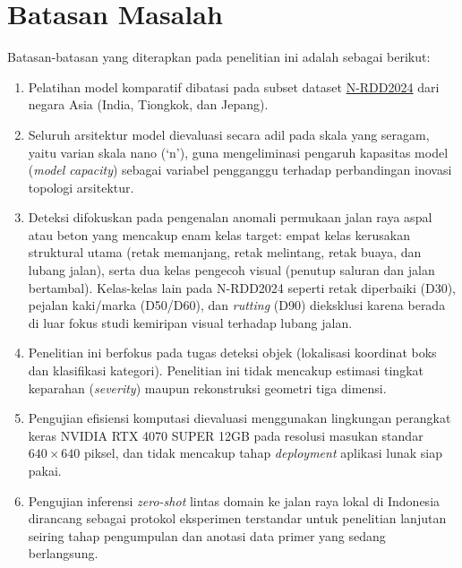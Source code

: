 \section{Batasan Masalah}
Batasan-batasan yang diterapkan pada penelitian ini adalah sebagai berikut:
\begin{enumerate}
  \item Pelatihan model komparatif dibatasi pada subset dataset \textcolor{blue}{\href{https://data.mendeley.com/datasets/27c8pwsd6v/3}{N-RDD2024}} dari negara Asia (India, Tiongkok, dan Jepang).
  \item Seluruh arsitektur model dievaluasi secara adil pada skala yang seragam, yaitu varian skala nano (`n'), guna mengeliminasi pengaruh kapasitas model (\textit{model capacity}) sebagai variabel pengganggu terhadap perbandingan inovasi topologi arsitektur.
  \item Deteksi difokuskan pada pengenalan anomali permukaan jalan raya aspal atau beton yang mencakup enam kelas target: empat kelas kerusakan struktural utama (retak memanjang, retak melintang, retak buaya, dan lubang jalan), serta dua kelas pengecoh visual (penutup saluran dan jalan bertambal). Kelas-kelas lain pada N-RDD2024 seperti retak diperbaiki (D30), pejalan kaki/marka (D50/D60), dan \textit{rutting} (D90) dieksklusi karena berada di luar fokus studi kemiripan visual terhadap lubang jalan.
  \item Penelitian ini berfokus pada tugas deteksi objek (lokalisasi koordinat boks dan klasifikasi kategori). Penelitian ini tidak mencakup estimasi tingkat keparahan (\textit{severity}) maupun rekonstruksi geometri tiga dimensi.
  \item Pengujian efisiensi komputasi dievaluasi menggunakan lingkungan perangkat keras NVIDIA RTX 4070 SUPER 12GB pada resolusi masukan standar $640 \times 640$ piksel, dan tidak mencakup tahap \textit{deployment} aplikasi lunak siap pakai.
  \item Pengujian inferensi \textit{zero-shot} lintas domain ke jalan raya lokal di Indonesia dirancang sebagai protokol eksperimen terstandar untuk penelitian lanjutan seiring tahap pengumpulan dan anotasi data primer yang sedang berlangsung.
\end{enumerate}


